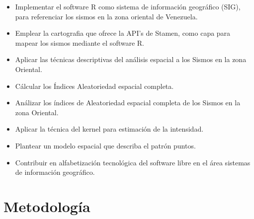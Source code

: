 \documentclass[12pt]{report}
\begin{document}
	
	

	\begin{itemize}

	      		
		\item  Implementar el software R como sistema de información geográfico (SIG), para referenciar los sismos 
		en la zona oriental de Venezuela. 	
		
		\item  Emplear la cartografia que ofrece la API's de Stamen, como capa para mapear los sismos mediante el software R. 
		
		\item   Aplicar las técnicas descriptivas del análisis espacial a los Sismos en la zona Oriental. 
		
		\item   Cálcular los Índices Aleatoriedad espacial completa.
		
		\item   Análizar los índices de Aleatoriedad espacial completa de los Sismos en la zona Oriental. 
		
		
		
		\item   Aplicar la técnica del kernel para estimación de la intensidad. 
		
		\item   Plantear un  modelo espacial que describa el patrón puntos. 
		
		\item   Contribuir en alfabetización tecnológica del software libre en el área sistemas de información geográfico.
		
	\end{itemize}
	
	
	
	\section{Metodología}
	
\end{document}
